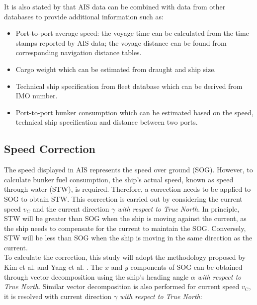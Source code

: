 \pagebreak

It is also stated by  that AIS data can be combined with data from other databases to provide additional information such as:\\

\begin{itemize}
    \setlength\itemsep{0em}
    \item Port-to-port average speed: the voyage time can be calculated from the time stamps reported by AIS data; the voyage distance can be found from corresponding navigation distance tables.
    \item Cargo weight which can be estimated from draught and ship size.
    \item Technical ship specification from fleet database which can be derived from IMO number.
    \item Port-to-port bunker consumption which can be estimated based on the speed, technical ship specification and distance between two ports.
\end{itemize}

\subsection{Speed Correction}\label{sec:SOG_corr}

The speed displayed in AIS represents the speed over ground (SOG). However, to calculate bunker fuel consumption, the ship's actual speed, known as speed through water (STW), is required. Therefore, a correction needs to be applied to SOG to obtain STW. This correction is carried out by considering the current speed $v_C$ and the current direction $\gamma$ \emph{with respect to True North}. In principle, STW will be greater than SOG when the ship is moving against the current, as the ship needs to compensate for the current to maintain the SOG. Conversely, STW will be less than SOG when the ship is moving in the same direction as the current.\\

To calculate the correction, this study will adopt the methodology proposed by Kim et al.  and Yang et al. . The $x$ and $y$ components of SOG can be obtained through vector decomposition using the ship's heading angle $\alpha$ \emph{with respect to True North}. Similar vector decomposition is also performed for current speed $v_{\text{C}}$, it is resolved with current direction $\gamma$ \emph{with respect to True North}:\\

